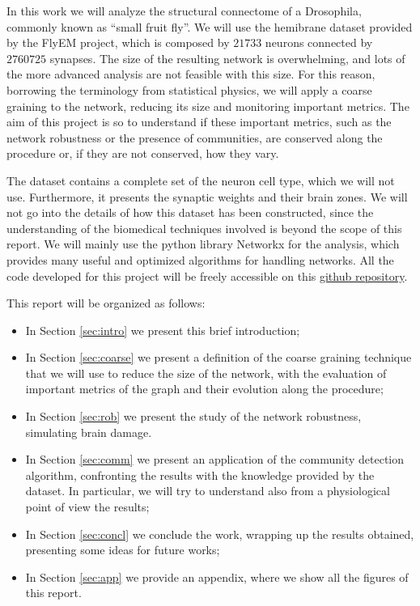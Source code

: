 In this work we will analyze the structural connectome of a Drosophila, commonly known as 
“small fruit fly”. We will use the hemibrane dataset provided by the FlyEM project\cite{xu2020connectome}, which is composed by $21733$ neurons connected by $2760725$ synapses. The size
of the resulting network is overwhelming, and lots of the more advanced analysis are 
not feasible with this size. For this reason, borrowing the terminology from statistical
physics, we will apply a coarse graining to the network, reducing its size and monitoring
important metrics. The aim of this project is so to understand if these important 
metrics, such as the network robustness or the presence of communities, are conserved
along the procedure or, if they are not conserved, how they vary.

The dataset contains a complete set of the neuron cell type, which we will
not use. Furthermore, it presents the synaptic weights and their brain zones. 
We will not go into the details of how this dataset has been constructed, since the understanding
of the biomedical techniques involved is beyond the scope of this report.
We will mainly use the python library Networkx\cite{hagberg2008exploring} for the analysis, 
which provides many useful and optimized algorithms for handling networks. All the code developed
for this project will be freely accessible on this \hyperlink{https://github.com/mballarin97/DrosophilaNetwork}{github repository}.


This report will be organized as follows:
\begin{itemize}
    \item In Section \ref{sec:intro} we present this brief introduction;
    \item In Section \ref{sec:coarse} we present a definition of the coarse graining technique that we will use to reduce the size 
        of the network, with the evaluation of important metrics of the graph and their 
        evolution along the procedure;
    \item In Section \ref{sec:rob} we present the study of the network robustness, simulating brain damage. 
    \item In Section \ref{sec:comm} we present an application of the community detection algorithm, confronting the results
        with the knowledge provided by the dataset. In particular, we will try to understand
        also from a physiological point of view the results;
    \item In Section \ref{sec:concl} we conclude the work, wrapping up the results obtained, presenting some 
        ideas for future works;
    \item In Section \ref{sec:app} we provide an appendix, where we show all the figures
     of this report.
\end{itemize}
